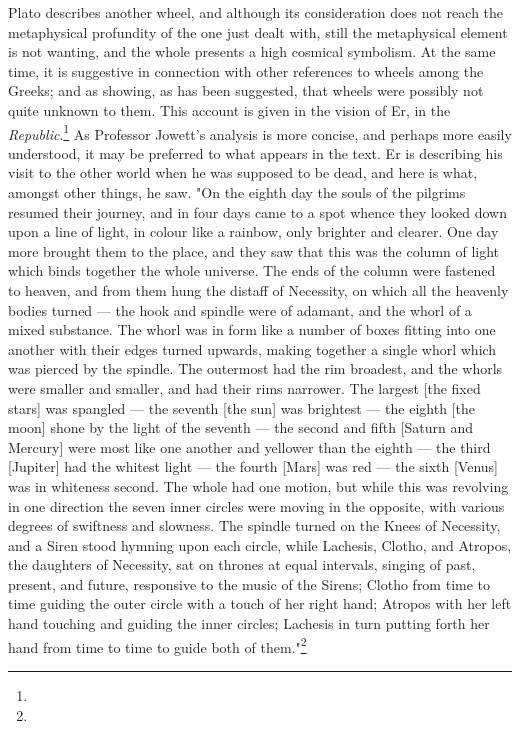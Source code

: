 \documentclass[a4paper, 11pt, oneside, polutonikogreek, english]{article}
\begin{document}
Plato describes another wheel, and although its consideration does not reach the metaphysical profundity of the one just dealt with, still the metaphysical element is not wanting, and the whole presents a high cosmical symbolism. At the same time, it is suggestive in connection with other references to wheels among the Greeks; and as showing, as has been suggested, that wheels were possibly not quite unknown to them. This account is given in the vision of Er, in the \emph{Republic}.\footnote{} As Professor Jowett's analysis is more concise, and perhaps more easily understood, it may be preferred to what appears in the text. Er is describing his visit to the other world when he was supposed to be dead, and here is what, amongst other things, he saw. "On the eighth day the souls of the pilgrims resumed their journey, and in four days came to a spot whence they looked down upon a line of light, in colour like a rainbow, only brighter and clearer. One day more brought them to the place, and they saw that this was the column of light which binds together the whole universe. The ends of the column were fastened to heaven, and from them hung the distaff of Necessity, on which all the heavenly bodies turned --- the hook and spindle were of adamant, and the whorl of a mixed substance. The whorl was in form like a number of boxes fitting into one another with their edges turned upwards, making together a single whorl which was pierced by the spindle. The outermost had the rim broadest, and the whorls were smaller and smaller, and had their rims narrower. The largest [the fixed stars] was spangled --- the seventh [the sun] was brightest --- the eighth [the moon] shone by the light of the seventh --- the second and fifth [Saturn and Mercury] were most like one another and yellower than the eighth --- the third [Jupiter] had the whitest light --- the fourth [Mars] was red --- the sixth [Venus] was in whiteness second. The whole had one motion, but while this was revolving in one direction the seven inner circles were moving in the opposite, with various degrees of swiftness and slowness. The spindle turned on the Knees of Necessity, and a Siren stood hymning upon each circle, while Lachesis, Clotho, and Atropos, the daughters of Necessity, sat on thrones at equal intervals, singing of past, present, and future, responsive to the music of the Sirens; Clotho from time to time guiding the outer circle with a touch of her right hand; Atropos with her left hand touching and guiding the inner circles; Lachesis in turn putting forth her hand from time to time to guide both of them."\footnote{}
\end{document}
